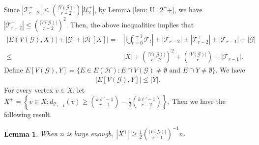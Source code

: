 \documentclass[12pt]{article}%
\newtheorem{lemma}[theorem]{Lemma}
\newcommand{\mh}{\mathcal{H}}
\newcommand{\mg}{\mathcal{G}}
\begin{document}
Since $\left|\mathcal{T}_{r-2}^+\right|\leq \binom{|V(\mg)|}{r-2}\left|\mathcal{U}_2^+\right|$, by Lemma \ref{lem: U_2^+}, we have
$\left|\mathcal{T}_{r-2}^+\right|\leq \binom{|V(\mg)|}{r-2}^2.$
Then, the above inequalities implies that
\begin{equation}\label{eq: number of edges 1}
    \begin{aligned}
|E(V(\mg),X)|+|\mg|+|\mh[X]|=&|\bigcup_{t=0}^{r-3} \mathcal{T}_t|+\left|\mathcal{T}_{r-2}^-\right|+\left|\mathcal{T}_{r-2}^+\right|+\left|\mathcal{T}_{r-1}\right|+|\mg|\\
        \leq & |X|+\binom{|V(\mg)|}{r-2}^2+\binom{|V(\mg)|}{r}+|\mathcal{T}_{r-1}|.
    \end{aligned}
\end{equation}
Define $E[V(\mg),Y]=\{E\in E(\mh):\text{$E\cap V(\mg)\neq \emptyset$ and $E\cap Y\neq \emptyset $} \}$. We have
\begin{equation}\label{eq: E(A,Y)}
    \begin{aligned}
        |E[V(\mg),Y]|\leq |Y|.
    \end{aligned}
\end{equation}
For every vertex $v\in X$, let
$X^+=\left\{v\in X: d_{\mathcal{T}_{r-1}}(v)\geq \binom{k\ell'-1}{r-1}-\frac{1}{2}\binom{k\ell'-1}{r-2}\right\}.$
 Then we have the following result.
\begin{lemma}\label{55-1}
    When $n$ is large enough, $|X^+|\geq \frac{1}{2}\binom{|V(\mg)|}{r-1}^{-1}n$.
\end{lemma}
\end{document}
